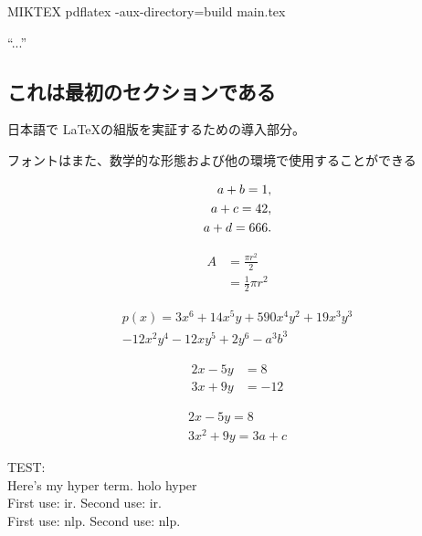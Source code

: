 
MIKTEX
pdflatex -aux-directory=build main.tex


``...''



\usepackage{CJKutf8}

\begin{CJK}{UTF8}{min}
\section{これは最初のセクションである}
日本語で \LaTeX の組版を実証するための導入部分。

フォントはまた、数学的な形態および他の環境で使用することができる
\end{CJK}

\begin{align}
a + b = 1, \notag \\
a + c = 42, \notag \\
a + d = 666. \label{all}
\end{align}

\begin{equation} \label{eq1}
\begin{split}
A & = \frac{\pi r^2}{2} \\
 & = \frac{1}{2} \pi r^2
\end{split}
\end{equation}

\begin{multline*}
p(x) = 3x^6 + 14x^5y + 590x^4y^2 + 19x^3y^3\\
- 12x^2y^4 - 12xy^5 + 2y^6 - a^3b^3
\end{multline*}

\begin{align*}
2x - 5y &=  8 \\
3x + 9y &=  -12
\end{align*}

\begin{gather*}
2x - 5y =  8 \\
3x^2 + 9y =  3a + c
\end{gather*}

TEST:\\
Here’s my \gls{hyper} term. \gls{holo} \gls{hyper}\\
First use: \gls{ir}. Second use: \gls{ir}.\\
First use: \gls{nlp}. Second use: \gls{nlp}.

